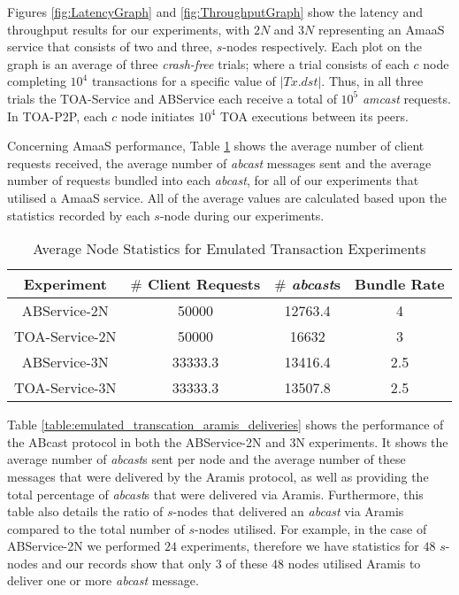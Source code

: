 	Figures \ref{fig:LatencyGraph} and \ref{fig:ThroughputGraph} show the latency and throughput results for our experiments, with $2N$ and $3N$ representing an \textsf{AmaaS} service that consists of two and three, $s$-nodes respectively.  Each plot on the graph is an average of three \emph{crash-free} trials; where a trial consists of each $c$ node completing $10^4$ transactions for a specific value of $|Tx.dst|$. Thus, in all three trials the TOA-Service and ABService each receive a total of $10^5$ \emph{amcast} requests. In TOA-P2P, each $c$ node initiates $10^4$ TOA executions between its peers.  
	
	Concerning \textsf{AmaaS} performance, Table \ref{table:emulated_transaction_averages} shows the average number of client requests received, the average number of \emph{abcast} messages sent and the average number of requests bundled into each \emph{abcast}, for all of our experiments that utilised a \textsf{AmaaS} service.  All of the average values are calculated based upon the statistics recorded by each $s$-node during our experiments. 
	
    \begin{table}[h]
  \begin{center}
    \begin{tabular}{|c|c|c|c|}
    \hline
    Experiment & $\#$ Client Requests  & $\#$ \emph{abcast}s & Bundle Rate \\ \hline \hline
    ABService-2N     & 50000    &    12763.4    &    4 \\ \hline
    TOA-Service-2N  & 50000    &   16632    &   3 \\ \hline
    ABService-3N     & 33333.3 &    13416.4  &   2.5 \\ \hline
    TOA-Service-3N  & 33333.3 &    13507.8 & 2.5 \\ \hline
    \end{tabular}
    \caption{Average Node Statistics for Emulated Transaction Experiments}
    \label{table:emulated_transaction_averages}
  \end{center}
\end{table}	
	
    Table \ref{table:emulated_transcation_aramis_deliveries} shows the performance of the \textsf{ABcast} protocol in both the ABService-2N and 3N experiments.  It shows the average number of \emph{abcast}s sent per node and the average number of these messages that were delivered by the Aramis protocol, as well as providing the total percentage of \emph{abcast}s that were delivered via Aramis.  Furthermore, this table also details the ratio of $s$-nodes that delivered an \emph{abcast} via Aramis compared to the total number of $s$-nodes utilised.  For example, in the case of ABService-2N we performed $24$ experiments, therefore we have statistics for $48$ $s$-nodes and our records show that only $3$ of these $48$ nodes utilised Aramis to deliver one or more \emph{abcast} message.  
	

